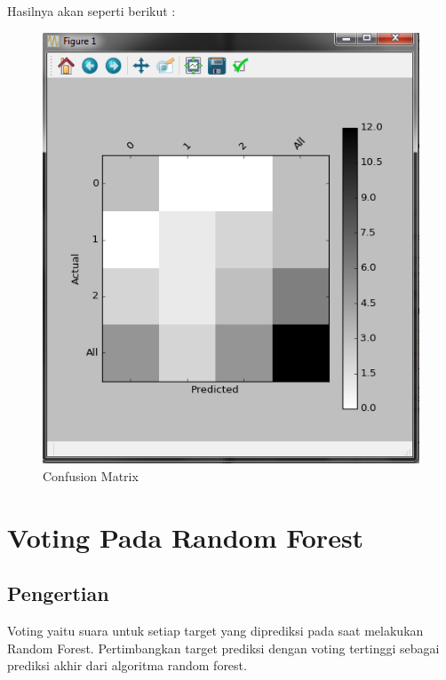 \begin{itemize}
Hasilnya akan seperti berikut :
\begin{figure}[ht]
\centering
\includegraphics[scale=0.5]{figures/teori5.png}
\caption{Confusion Matrix}
\label{Contoh}
\end{figure}
\end{itemize}

\section{Voting Pada Random Forest}
\subsection{Pengertian}
Voting yaitu suara untuk setiap target yang diprediksi pada saat melakukan Random Forest. Pertimbangkan target prediksi dengan voting tertinggi sebagai prediksi akhir dari algoritma random forest.

